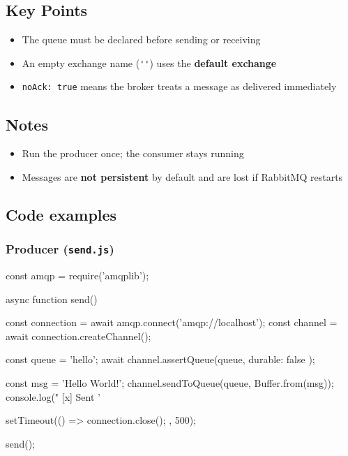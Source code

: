 \documentclass[11pt,a4paper]{article}
\begin{document}
\subsection*{Key Points}

\begin{itemize}\itemsep2pt
  \item The queue must be declared before sending or receiving
  \item An empty exchange name (\lstinline|''|) uses the \textbf{default exchange}
  \item \lstinline|noAck: true| means the broker treats a message as delivered immediately
\end{itemize}

\subsection*{Notes}

\begin{itemize}\itemsep2pt
  \item Run the producer once; the consumer stays running
  \item Messages are \textbf{not persistent} by default and are lost if RabbitMQ restarts
\end{itemize}

\newpage
\subsection{Code examples}

\subsubsection*{Producer (\texttt{send.js})}
\begin{js}
const amqp = require('amqplib');

async function send() {
    const connection = await amqp.connect('amqp://localhost');
    const channel = await connection.createChannel();

    const queue = 'hello';
    await channel.assertQueue(queue, { durable: false });

    const msg = 'Hello World!';
    channel.sendToQueue(queue, Buffer.from(msg));
    console.log(" [x] Sent '%

    setTimeout(() => { connection.close(); }, 500);
}
send();
\end{js}
\end{document}
